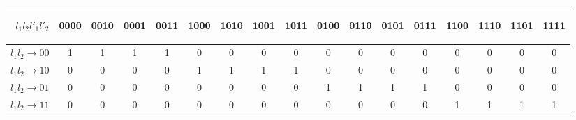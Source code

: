 \begin{table}[!ht]
\centering
\begin{tabular}{ r || c | c | c | c | c | c | c | c | c | c | c | c | c | c | c | c }
		\begin{sideways}$l_1 l_2 l'_1 l'_2$\end{sideways} &	\begin{sideways}0000\end{sideways} & \begin{sideways}0010\end{sideways} & \begin{sideways}0001\end{sideways} & \begin{sideways}0011\end{sideways}
			  & \begin{sideways}1000\end{sideways} & \begin{sideways}1010\end{sideways} & \begin{sideways}1001\end{sideways} & \begin{sideways}1011\end{sideways}
			  &	\begin{sideways}0100\end{sideways} & \begin{sideways}0110\end{sideways} & \begin{sideways}0101\end{sideways} & \begin{sideways}0111\end{sideways}
			  &	\begin{sideways}1100\end{sideways} & \begin{sideways}1110\end{sideways} & \begin{sideways}1101\end{sideways} & \begin{sideways}1111\end{sideways}\\ \hline \hline
    $l_1 l_2 \rightarrow 00$ & 1 & 1 & 1 & 1 & 0 & 0 & 0 & 0 & 0 & 0 & 0 & 0 & 0 & 0 & 0 & 0\\ \hline
    $l_1 l_2 \rightarrow 10$ & 0 & 0 & 0 & 0 & 1 & 1 & 1 & 1 & 0 & 0 & 0 & 0 & 0 & 0 & 0 & 0\\ \hline
    $l_1 l_2 \rightarrow 01$ & 0 & 0 & 0 & 0 & 0 & 0 & 0 & 0 & 1 & 1 & 1 & 1 &  0 & 0 & 0 & 0\\ \hline
    $l_1 l_2 \rightarrow 11$ & 0 & 0 & 0 & 0 & 0 & 0 & 0 & 0 & 0 & 0 & 0 & 0 & 1 & 1 & 1 & 1\\ \hline


\end{tabular}
\end{table}
